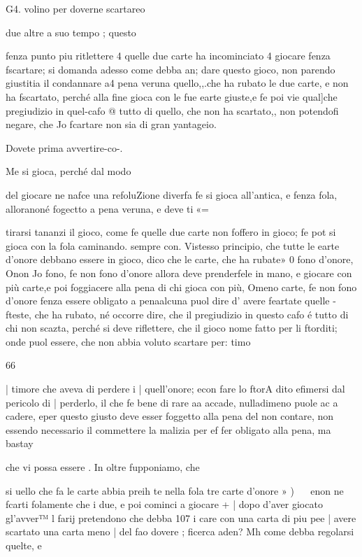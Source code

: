 \documentclass[12pt,a6paper]{article}
\begin{document}
 

 

 

G4.
volino per doverne scartareo

due altre a suo tempo ; questo

fenza punto piu ritlettere 4 quelle due carte ha incominciato 4
giocare fenza fscartare; si domanda adesso come debba an;
dare questo gioco, non parendo
giustitia il condannare a4 pena
veruna quello,,.che ha rubato le
due carte, e non ha fscartato,
perché alla fine gioca con le fue
earte giuste,e fe poi vie qual]che pregiudizio in quel-cafo @
tutto di quello, che non ha scartato,, non potendofi negare, che
Jo fcartare non sia di gran yantageio.

Dovete prima avvertire-co-.

Me si gioca, perché dal modo

del giocare ne nafce una refoluZione diverfa fe si gioca all’antica, e fenza fola, alloranoné
fogectto a pena veruna, e deve
ti«=

tirarsi tananzi il gioco, come fe
quelle due carte non foffero in
gioco; fe pot si gioca con la
fola caminando. sempre con.
Vistesso principio, che tutte le
earte d’onore debbano essere in
gioco, dico che le carte, che ha
rubate» 0 fono d’onore, Onon
Jo fono, fe non fono d’onore
allora deve prenderfele in mano, e giocare con più carte,e
poi foggiacere alla pena di chi
gioca con più, Omeno carte,
fe non fono d’onore fenza essere obligato a penaalcuna puol
dire d' avere feartate quelle
- fteste, che ha rubato, né occorre dire, che il pregiudizio in
questo cafo é tutto di chi non
scazta, perché si deve riflettere,
che il gioco nome fatto per li
ftorditi; onde puol essere, che
non abbia voluto scartare per:
timo  

66

| timore che aveva di perdere
i | quell’onore; econ fare lo ftorA dito efimersi dal pericolo di
| perderlo, il che fe bene di rare
aa accade, nulladimeno puole ac
a cadere, eper questo giusto deve
esser foggetto alla pena del non
contare, non essendo necessario
il commettere la malizia per ef
fer obligato alla pena, ma bastay

che vi possa essere .
In oltre fupponiamo, che

si uello che fa le carte abbia preih te nella fola tre carte d’onore »
) ~~ enon ne fcarti folamente che
i due, e poi cominci a giocare +
| dopo d’aver giocato gl’avver™
l farij pretendono che debba 107
i care con una carta di piu pee
| avere scartato una carta meno
| del fao dovere ; ficerca aden?
Mh come debba regolarsi quelte, e
\end{document}
